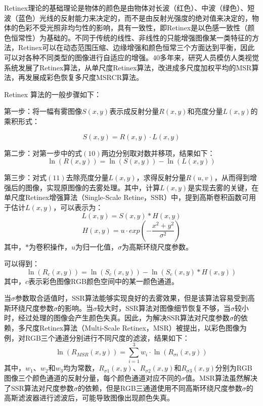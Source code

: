 \documentclass[12pt]{article}
\begin{document}
Retinex理论的基础理论是物体的颜色是由物体对长波（红色）、中波（绿色）、短波（蓝色）光线的反射能力来决定的，而不是由反射光强度的绝对值来决定的，物体的色彩不受光照非均匀性的影响，具有一致性，即Retinex是以色感一致性（颜色恒常性）为基础的。不同于传统的线性、非线性的只能增强图像某一类特征的方法，Retinex可以在动态范围压缩、边缘增强和颜色恒常三个方面达到平衡，因此可以对各种不同类型的图像进行自适应的增强。40多年来，研究人员模仿人类视觉系统发展了Retinex算法，从单尺度Retinex算法，改进成多尺度加权平均的MSR算法，再发展成彩色恢复多尺度MSRCR算法。

Retinex 算法的一般步骤如下：

第一步：将一幅有雾图像$S(x,y)$表示成反射分量$R(x,y)$和亮度分量$L(x,y)$的乘积形式：

\begin{equation}
    S(x,y)=R(x,y)·L(x,y)
\end{equation}

第二步：对第一步中的式$(10)$两边分别取对数并移项，结果如下：
\begin{equation}
    \ln(R(x,y))=\ln(S(x,y))-\ln(L(x,y))
\end{equation}

第三步：对式$(11)$去除亮度分量$L(x,y)$，求得反射分量$R(u,v)$，从而得到增强后的图像，实现原图像的去雾处理。其中，计算$L(x,y)$是实现去雾的关键，在单尺度Retinex增强算法（Single-Scale Retine，SSR）中，提到高斯卷积函数可用于估计$L(x,y)$，可以表示为：
\begin{equation}
    L(x,y)=S(x,y)*H(x,y)
\end{equation}
\begin{equation}
    H(x,y)=u·exp(-\frac{x^2+y^2}{\sigma^2})
\end{equation}
其中，$*$为卷积操作，$u$为归一化值，$\sigma$为高斯环绕尺度参数。

可以得到：
\begin{equation}
    \ln(R_c(x,y))=\ln(S_c(x,y))-\ln(S_c(x,y) * H(x,y))
\end{equation}
其中，$c$表示彩色图像RGB颜色空间中的某一颜色通道。

当$\sigma$参数取合适值时，SSR算法能够实现良好的去雾效果，但是该算法容易受到高斯环绕尺度参数$\sigma$的影响。当$\sigma$较大时，SSR算法对图像细节恢复不够，当$\sigma$较小时，经过处理的图像会产生颜色失真。因此，为解决SSR算法对尺度参数$\sigma$的依赖，多尺度Retinex算法（Multi-Scale Retinex，MSR）被提出，以彩色图像为例，对RGB三个通道分别进行不同尺度的滤波，结果如下：
\begin{equation}
    \ln(R_{MSR}(x,y))=\sum_{i=1}^{3}{w_i ·\ln(R_{\sigma i}(x,y))}
\end{equation}
其中，$w_1$、$w_2$和$w_3$均为常数，$R_{\sigma 1}(x,y)$、$R_{\sigma 2}(x,y)$和$R_{\sigma 3}(x,y)$分别为RGB图像三个颜色通道的反射分量，每个颜色通道对应不同的$\sigma$值。MSR算法虽然解决了SSR算法对尺度参数$\sigma$的依赖，但是RGB三通道使用不同高斯环绕尺度参数$\sigma$的高斯滤波器进行滤波后，可能导致图像出现颜色失真。
\end{document}
